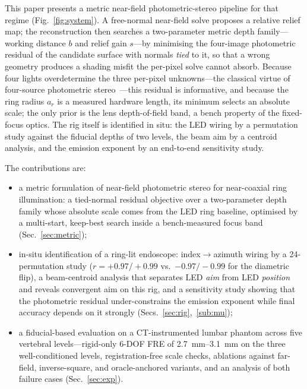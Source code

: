 \documentclass[conference]{IEEEtran}
\begin{document}
This paper presents a metric near-field photometric-stereo pipeline for
that regime (Fig.~\ref{fig:system}).  A free-normal near-field solve
proposes a relative relief map; the reconstruction then searches a
two-parameter metric depth family---working distance $b$ and relief gain
$s$---by minimising the four-image photometric residual of the candidate
surface with normals \emph{tied} to it, so that a wrong geometry produces
a shading misfit the per-pixel solve cannot absorb.  Because four lights
overdetermine the three per-pixel unknowns---the classical virtue of
four-source photometric stereo~\cite{coleman1982,barsky2003}---this
residual is informative, and because the ring radius $a_r$ is a measured
hardware length, its minimum selects an absolute scale; the only prior is
the lens depth-of-field band, a bench property of the fixed-focus optics.
The rig itself is identified in situ: the LED wiring by a
permutation study against the fiducial depths of two levels, the beam aim
by a centroid analysis, and the emission exponent by an end-to-end
sensitivity study.

The contributions are:
\begin{itemize}
\item a metric formulation of near-field photometric stereo for
near-coaxial ring illumination: a tied-normal residual objective over a
two-parameter depth family whose absolute scale comes from the LED ring
baseline, optimised by a multi-start, keep-best search inside a
bench-measured focus band (Sec.~\ref{sec:metric});
\item in-situ identification of a ring-lit endoscope:
index$\to$azimuth wiring by a 24-permutation study
($r={+}0.97/{+}0.99$ vs.\ ${-}0.97/{-}0.99$ for the diametric flip), a
beam-centroid analysis that separates LED \emph{aim} from LED
\emph{position} and reveals convergent aim on this rig, and a sensitivity
study showing that the photometric residual under-constrains the emission
exponent while final accuracy depends on it strongly
(Secs.~\ref{sec:rig},~\ref{sub:mu});
\item a fiducial-based evaluation on a CT-instrumented lumbar phantom
across five vertebral levels---rigid-only 6-DOF FRE of
\SIrange{2.7}{3.1}{\milli\meter} on the three well-conditioned levels,
registration-free scale checks, ablations against far-field,
inverse-square, and oracle-anchored variants, and an analysis of both
failure cases (Sec.~\ref{sec:exp}).
\end{itemize}
\end{document}

